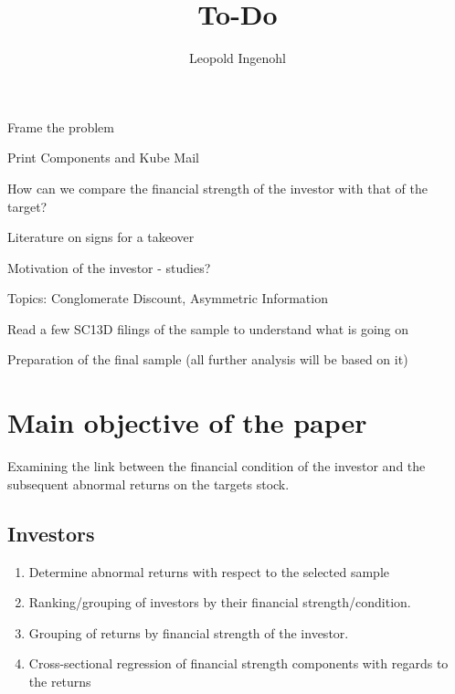 \documentclass{article}
\title{To-Do}
\author{Leopold Ingenohl}
\newcommand{\cmark}{\ding{51}}%
\newcommand{\done}{\rlap{$\square$}{\raisebox{2pt}{\large\hspace{1pt}\cmark}}%
\hspace{-2.5pt}}
\begin{document}
\maketitle


  \begin{todolist}
  \item[\done] Frame the problem
  \end{todolist}

\begin{todolist}

  \item Print Components and Kube Mail 
  \item How can we compare the financial strength of the investor with that of the target?
  \item Literature on signs for a takeover
  \item Motivation of the investor - studies?
  \item Topics: Conglomerate Discount, Asymmetric Information
  \item Read a few SC13D filings of the sample to understand what is going on
  \item Preparation of the final sample (all further analysis will be based on it)


\end{todolist}

\section{Main objective of the paper}

  \begin{center}
    Examining the link between the financial condition of the investor and the subsequent abnormal returns on the targets stock.
  \end{center}

  \subsection{Investors}
    
    \begin{enumerate}

      \item Determine abnormal returns with respect to the selected sample 

      \item Ranking/grouping of investors by their financial strength/condition. 

      \item Grouping of returns by financial strength of the investor.

      \item Cross-sectional regression of financial strength components with regards to the returns
    \end{enumerate}
\end{document}
